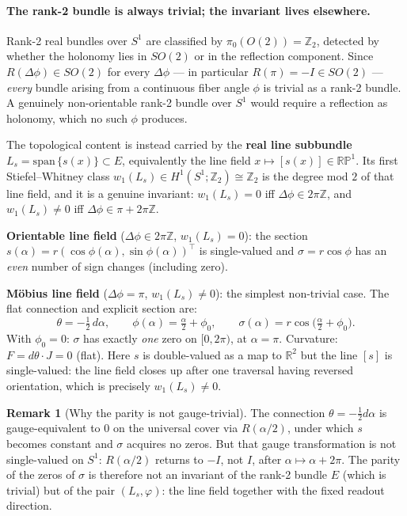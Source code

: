 \documentclass[11pt, a4paper]{article}
\theoremstyle{plain}
\theoremstyle{definition}
\newtheorem{remark}[theorem]{Remark}
\newcommand{\R}{\mathbb{R}}
\begin{document}
\paragraph{The rank-2 bundle is always trivial; the invariant lives elsewhere.}
Rank-2 real bundles over $S^1$ are classified by $\pi_0(O(2)) = \mathbb{Z}_2$,
detected by whether the holonomy lies in $SO(2)$ or in the reflection component.
Since $R(\Delta\phi) \in SO(2)$ for every $\Delta\phi$ --- in particular
$R(\pi) = -I \in SO(2)$ --- \emph{every} bundle arising from a continuous fiber
angle $\phi$ is trivial as a rank-2 bundle. A genuinely non-orientable rank-2
bundle over $S^1$ would require a reflection as holonomy, which no such $\phi$
produces.

The topological content is instead carried by the \textbf{real line subbundle}
$L_s = \mathrm{span}\,\{s(x)\} \subset E$, equivalently the line field
$x \mapsto [s(x)] \in \mathbb{RP}^1$. Its first Stiefel--Whitney class
$w_1(L_s) \in H^1(S^1;\mathbb{Z}_2) \cong \mathbb{Z}_2$ is the degree mod $2$
of that line field, and it is a genuine invariant:
$w_1(L_s) = 0$ iff $\Delta\phi \in 2\pi\mathbb{Z}$, and $w_1(L_s) \neq 0$ iff
$\Delta\phi \in \pi + 2\pi\mathbb{Z}$.

\textbf{Orientable line field} ($\Delta\phi \in 2\pi\mathbb{Z}$, $w_1(L_s) = 0$):
the section $s(\alpha) = r(\cos\phi(\alpha), \sin\phi(\alpha))^\top$ is
single-valued and $\sigma = r\cos\phi$ has an \emph{even} number of sign changes
(including zero).

\textbf{Möbius line field} ($\Delta\phi = \pi$, $w_1(L_s) \neq 0$): the simplest
non-trivial case. The flat connection and explicit section are:
\[
  \theta = -\tfrac{1}{2}\,d\alpha, \qquad
  \phi(\alpha) = \tfrac{\alpha}{2} + \phi_0, \qquad
  \sigma(\alpha) = r\cos\!\bigl(\tfrac{\alpha}{2} + \phi_0\bigr).
\]
With $\phi_0 = 0$: $\sigma$ has exactly \emph{one} zero on $[0,2\pi)$, at
$\alpha = \pi$. Curvature: $F = d\theta \cdot J = 0$ (flat). Here $s$ is
double-valued as a map to $\R^2$ but the line $[s]$ is single-valued: the line
field closes up after one traversal having reversed orientation, which is
precisely $w_1(L_s) \neq 0$.

\begin{remark}[Why the parity is not gauge-trivial]
The connection $\theta = -\tfrac12 d\alpha$ is gauge-equivalent to $0$ on the
universal cover via $R(\alpha/2)$, under which $s$ becomes constant and $\sigma$
acquires no zeros. But that gauge transformation is not single-valued on $S^1$:
$R(\alpha/2)$ returns to $-I$, not $I$, after $\alpha \mapsto \alpha + 2\pi$.
The parity of the zeros of $\sigma$ is therefore not an invariant of the rank-2
bundle $E$ (which is trivial) but of the pair $(L_s, \varphi)$: the line field
together with the fixed readout direction.
\end{remark}
\end{document}
